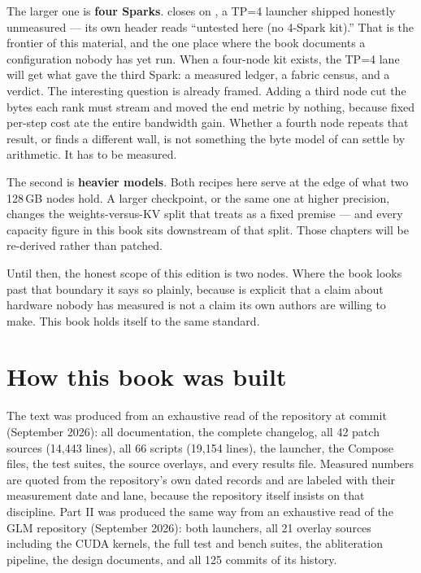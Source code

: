 The larger one is \textbf{four Sparks}.  closes on
, a TP=4 launcher shipped honestly unmeasured --- its
own header reads ``untested here (no 4-Spark kit).'' That is the frontier of
this material, and the one place where the book documents a configuration
nobody has yet run. When a four-node kit exists, the TP=4 lane will get what
 gave the third Spark: a measured ledger, a fabric census,
and a verdict. The interesting question is already framed. Adding a third
node cut the bytes each rank must stream and moved the end metric by nothing,
because fixed per-step cost ate the entire bandwidth gain. Whether a fourth
node repeats that result, or finds a different wall, is not something the
byte model of  can settle by arithmetic. It has to be measured.

The second is \textbf{heavier models}. Both recipes here serve at the edge of
what two 128\,GB nodes hold. A larger checkpoint, or the same one at higher
precision, changes the weights-versus-KV split that  treats
as a fixed premise --- and every capacity figure in this book sits downstream
of that split. Those chapters will be re-derived rather than patched.

Until then, the honest scope of this edition is two nodes. Where the book
looks past that boundary it says so plainly, because
 is explicit that a claim about hardware nobody has
measured is not a claim its own authors are willing to make. This book holds
itself to the same standard.

\section*{How this book was built}

The text was produced from an exhaustive read of the repository at commit
 (September 2026): all documentation, the complete changelog,
all 42 patch sources (14{,}443 lines), all 66 scripts (19{,}154 lines), the
launcher, the Compose files, the test suites, the source overlays, and every
results file. Measured numbers are quoted from the repository's own dated
records and are labeled with their measurement date and lane, because the
repository itself insists on that discipline. Part II was produced the same
way from an exhaustive read of the GLM repository (September 2026): both
launchers, all 21 overlay sources including the CUDA kernels, the full test
and bench suites, the abliteration pipeline, the design documents, and all
125 commits of its history.

